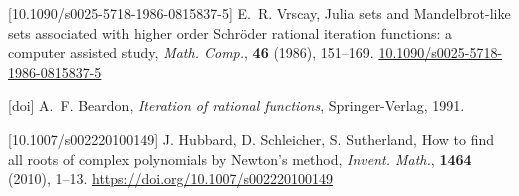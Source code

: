 \IfFileExists{aims.cls}{\documentclass{aims}}{\documentclass[11pt]{article}}
\numberwithin{equation}{section}
\theoremstyle{thmstyleone}%
\theoremstyle{thmstyletwo}%
\theoremstyle{thmstylethree}%
\providecommand{\doilink}[1]{\href{#1}{#1}}
\begin{document}
\begin{thebibliography}{999}
[10.1090/s0025-5718-1986-0815837-5]
E.~R. Vrscay,  {Julia sets and Mandelbrot-like sets associated with higher order Schr\"oder rational iteration functions: a computer assisted study},
      {\it Math. Comp.},
      \textbf{46} (1986), 151--169. \doilink{10.1090/s0025-5718-1986-0815837-5}



[doi]
A.~F. Beardon, {\em Iteration of rational functions}, 
 Springer-Verlag, 1991.


[10.1007/s002220100149]
J. Hubbard, D. Schleicher, S. Sutherland,  {How to find all roots of complex polynomials by Newton's method},
      {\it Invent. Math.},
      \textbf{1464} (2010), 1--13. \doilink{https://doi.org/10.1007/s002220100149}






\end{thebibliography}



\end{document}
